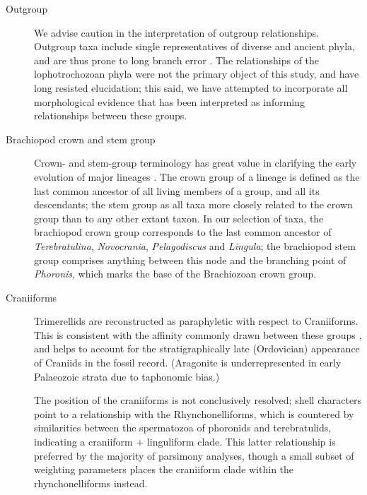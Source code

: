 \documentclass[openany]{book}
\begin{document}
\begin{description}
\item[Outgroup]
We advise caution in the interpretation of outgroup relationships.
Outgroup taxa include single representatives of diverse and ancient
phyla, and are thus prone to long branch error \citep{Parks2014}. The
relationships of the lophotrochozoan phyla were not the primary object
of this study, and have long resisted elucidation; this said, we have
attempted to incorporate all morphological evidence that has been
interpreted as informing relationships between these groups.
\item[Brachiopod crown and stem group]
Crown- and stem-group terminology has great value in clarifying the
early evolution of major lineages \citep{Budd2000, Carlson2009}. The
crown group of a lineage is defined as the last common ancestor of all
living members of a group, and all its descendants; the stem group as
all taxa more closely related to the crown group than to any other
extant taxon. In our selection of taxa, the brachiopod crown group
corresponds to the last common ancestor of \emph{Terebratulina},
\emph{Novocrania}, \emph{Pelagodiscus} and \emph{Lingula}; the
brachiopod stem group comprises anything between this node and the
branching point of \emph{Phoronis}, which marks the base of the
Brachiozoan crown group.
\item[Craniiforms]
Trimerellids are reconstructed as paraphyletic with respect to
Craniiforms. This is consistent with the affinity commonly drawn between
these groups \citep[e.g.][]{Williams2000LinguliformeaCraniiformea}, and
helps to account for the stratigraphically late (Ordovician) appearance
of Craniids in the fossil record. (Aragonite is underrepresented in
early Palaeozoic strata due to taphonomic bias.)

The position of the craniiforms is not conclusively resolved; shell
characters point to a relationship with the Rhynchonelliforms, which is
countered by similarities between the spermatozoa of phoronids and
terebratulids, indicating a craniiform + linguliform clade. This latter
relationship is preferred by the majority of parsimony analyses, though
a small subset of weighting parameters places the craniiform clade
within the rhynchonelliforms instead.


\end{description}
\end{document}
